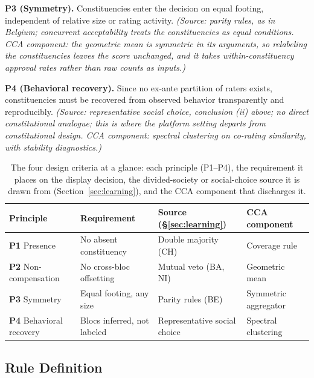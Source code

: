 \documentclass[10pt,twocolumn]{article}
\begin{document}
\textbf{P3 (Symmetry).} Constituencies enter the decision on equal footing,
independent of relative size or rating activity. \emph{(Source: parity rules, as
in Belgium; concurrent acceptability treats the constituencies as equal
conditions. CCA component: the geometric mean is symmetric in its arguments, so
relabeling the constituencies leaves the score unchanged, and it takes
within-constituency approval rates rather than raw counts as inputs.)}

\textbf{P4 (Behavioral recovery).} Since no ex-ante partition of raters exists,
constituencies must be recovered from observed behavior transparently and
reproducibly. \emph{(Source: representative social choice, conclusion (ii) above;
no direct constitutional analogue; this is where the platform setting departs
from constitutional design. CCA component: spectral clustering on co-rating
similarity, with stability diagnostics.)}

\begin{table}[t]
  \centering
  \footnotesize
  \setlength{\tabcolsep}{4pt}
  \renewcommand{\arraystretch}{1.25}
  \begin{tabularx}{\columnwidth}{@{}YYYY@{}}
    \toprule
    \textbf{Principle} & \textbf{Requirement} & \textbf{Source (\S\ref{sec:learning})} & \textbf{CCA component} \\
    \midrule
    \textbf{P1} Presence & No absent constituency & Double majority (CH) & Coverage rule \\
    \addlinespace[2pt]
    \textbf{P2} Non-compensation & No cross-bloc offsetting & Mutual veto (BA, NI) & Geometric mean \\
    \addlinespace[2pt]
    \textbf{P3} Symmetry & Equal footing, any size & Parity rules (BE) & Symmetric aggregator \\
    \addlinespace[2pt]
    \textbf{P4} Behavioral recovery & Blocs inferred, not labeled & Representative social choice & Spectral clustering \\
    \bottomrule
  \end{tabularx}
  \caption{The four design criteria at a glance: each principle (P1--P4), the
  requirement it places on the display decision, the divided-society or
  social-choice source it is drawn from (Section~\ref{sec:learning}), and the
  CCA component that discharges it.}
  \label{tab:principles-map}
\end{table}

\subsection*{Rule Definition}
\end{document}
